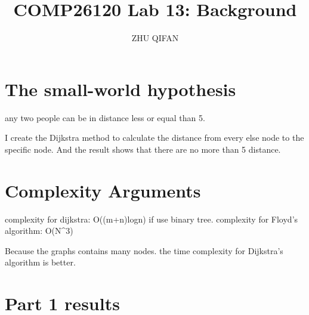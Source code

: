 \documentclass{article}
\title{COMP26120 Lab 13: Background}
\author{ZHU QIFAN}
\begin{document}
\maketitle


\section{The small-world hypothesis}
\label{sec:small world}

any two people can be in distance less or equal than 5.

I create the Dijkstra method to calculate the distance from every else node to the specific node.
And the result shows that there are no more than 5 distance.

\section{Complexity Arguments}
\label{sec:complexity}

complexity for dijkstra: O((m+n)logn) if use binary tree.
complexity for Floyd's algorithm: O(N^3)

Because the graphs contains many nodes. the time complexity for Dijkstra's algorithm is better.

\section{Part 1 results}
\label{sec:part1}
\end{document}
